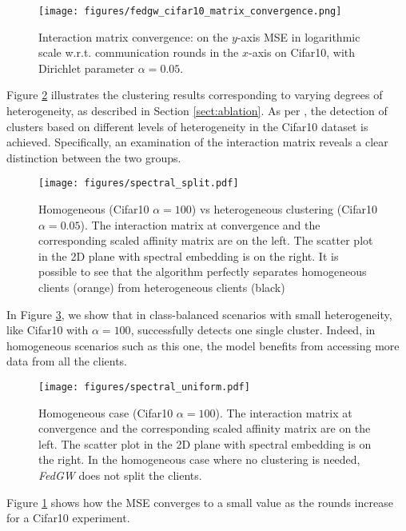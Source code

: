 \begin{figure}[htbp]
    \centering
    \texttt{[image: figures/fedgw\_cifar10\_matrix\_convergence.png]}
    \caption{\small{Interaction matrix convergence: on the $y$-axis MSE in logarithmic scale w.r.t. communication rounds in the $x$-axis on Cifar10, with Dirichlet parameter $\alpha = 0.05$.}}
    \label{fig:mse_conv}
\end{figure}
Figure \ref{fig:hom-het} illustrates the clustering results corresponding to varying degrees of heterogeneity, as described in Section \ref{sect:ablation}. As per \shortname, the detection of clusters based on different levels of heterogeneity in the Cifar10 dataset is achieved. Specifically, an examination of the interaction matrix reveals a clear distinction between the two groups.
\begin{figure}[h]
    \centering
    \texttt{[image: figures/spectral\_split.pdf]}
    \caption{\small{Homogeneous (Cifar10 $\alpha = 100$) vs heterogeneous clustering (Cifar10 $\alpha = 0.05$). The interaction matrix at convergence and the corresponding scaled affinity matrix are on the left. The scatter plot in the 2D plane with spectral embedding is on the right. It is possible to see that the algorithm perfectly separates homogeneous clients (orange) from heterogeneous clients (black) }}
    \label{fig:hom-het}
\end{figure}
In Figure \ref{fig:hom}, we show that in class-balanced scenarios with small heterogeneity, like Cifar10 with $\alpha = 100$, \shortname successfully detects one single cluster. Indeed, in homogeneous scenarios such as this one, the model benefits from accessing more data from all the clients.
\begin{figure}[h]
    \centering
    \texttt{[image: figures/spectral\_uniform.pdf]}
    \caption{\small{Homogeneous case (Cifar10 $\alpha = 100$).  The interaction matrix at convergence and the corresponding scaled affinity matrix are on the left. The scatter plot in the 2D plane with spectral embedding is on the right. In the homogeneous case where no clustering is needed, \textit{FedGW} does not split the clients.}}
    \label{fig:hom}
\end{figure}

Figure \ref{fig:mse_conv} shows how the MSE converges to a small value as the rounds increase for a Cifar10 experiment.

